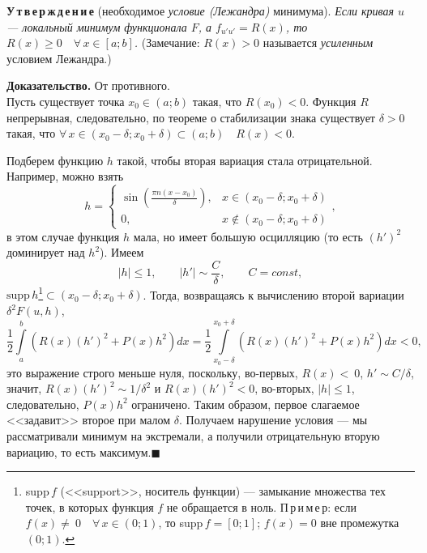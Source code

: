 \documentclass[12pt,a5paper]{book}
\begin{document}
	\noindent \textbf{У\,т\,в\,е\,р\,ж\,д\,е\,н\,и\,е} (необходимое \emph{условие (Лежандра)} минимума). \textit{Если кривая $u$ --- локальный минимум функционала $F$, а $f_{u'u'} = R(x)$, то $R(x) \geq 0 \quad \forall\,x \in [a;b]$.} (Замечание: $R(x) > 0$ называется \emph{усиленным} условием Лежандра.)
	
	\vspace*{0.5em}
	\noindent \textbf{Доказательство.} От противного. \\
	Пусть существует точка $x_0 \in (a;b)$ такая, что $R(x_0) < 0$. Функция $R$ непрерывная, следовательно, по теореме о стабилизации знака существует $\delta > 0$ такая, что $\forall\,x \in (x_0 - \delta; x_0 + \delta) \subset (a;b) \quad R(x) < 0$.
	
	Подберем функцию $h$ такой, чтобы вторая вариация стала отрицательной. Например, можно взять
	\begin{equation*}
		h = \begin{cases}
			\sin\left(\frac{\pi n (x - x_0)}{\delta}\right), & x \in (x_0 - \delta; x_0 + \delta) \\
			0, & x \notin (x_0 - \delta; x_0 + \delta)
		\end{cases},
	\end{equation*}
	в этом случае функция $h$ мала, но имеет большую осцилляцию (то есть $(h')^2$ доминирует над $h^2$). Имеем
	\begin{equation*}
		|h| \leq 1, \qquad |h'| \sim \frac{C}{\delta},\qquad C = const,
	\end{equation*}
	$\text{supp}\,h$\footnote{supp\,$f$ (<<support>>, носитель функции) --- замыкание множества тех точек, в которых функция $f$ не обращается в ноль. П\,р\,и\,м\,е\,р: если $f(x) \neq~0 \quad \forall\,x \in (0;1)$, то supp\,$f = [0;1]$; $f(x) = 0$ вне промежутка $(0;1)$.}$ \subset (x_0 - \delta; x_0 + \delta)$. Тогда, возвращаясь к вычислению второй вариации $\delta^2F(u,h)$,
	\begin{equation*}
		\frac{1}{2}\int\limits_a^b \left(R(x)\left(h'\right)^2 + P(x)h^2\right)dx = \frac{1}{2}\int\limits_{x_0 - \delta}^{x_0 + \delta} \left(R(x)\left(h'\right)^2 + P(x)h^2\right)dx < 0,
	\end{equation*}
	это выражение строго меньше нуля, поскольку, во-первых, $R(x) <~0$, $h' \sim C/\delta$, значит, $R(x)(h')^2 \sim 1/\delta^2$ и $R(x)(h')^2 < 0$, во-вторых, $|h| \leq 1$, следовательно, $P(x)h^2$ ограничено. Таким образом, первое слагаемое <<задавит>> второе при малом $\delta$. Получаем нарушение условия --- мы рассматривали минимум на экстремали, а получили отрицательную вторую вариацию, то есть максимум.$\blacksquare$
	
\end{document}
